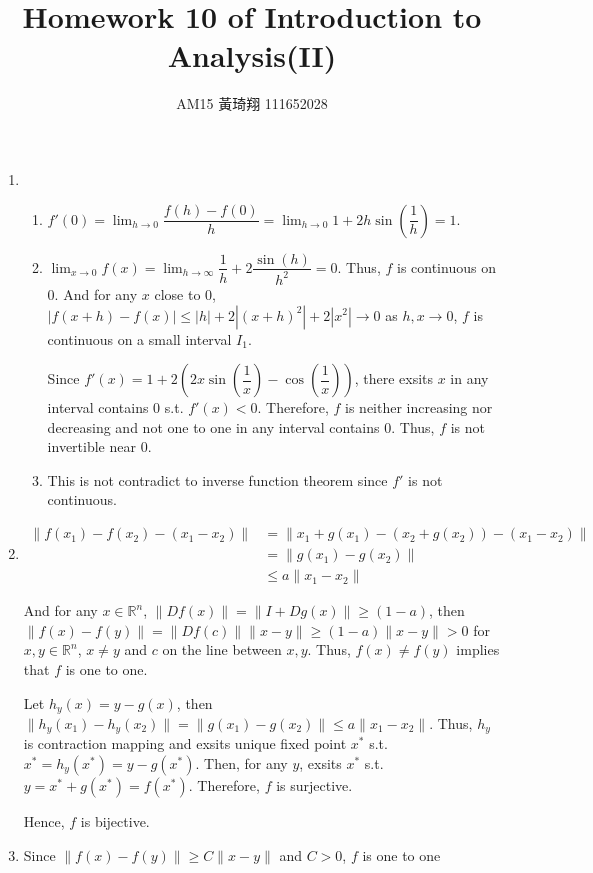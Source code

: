 \documentclass[12pt]{article}
\title{Homework 10 of Introduction to Analysis(II)}
\author{AM15 黃琦翔 111652028}
\begin{document}
\maketitle
\begin{enumerate}
    \item \begin{enumerate}
        \item $f'(0) = \displaystyle\lim_{h\to 0} \dfrac{f(h) - f(0)}{h} = \displaystyle\lim_{h\to 0} 1 + 2h\sin(\dfrac{1}{h}) = 1$.
        
        \item $\displaystyle\lim_{x\to 0} f(x) = \displaystyle\lim_{h\to \infty} \dfrac{1}{h} + 2\dfrac{\sin(h)}{h^2} = 0$.
        Thus, $f$ is continuous on $0$.
        And for any $x$ close to $0$, $|f(x+h) - f(x)| \leq |h| + 2|(x+h)^2| + 2|x^2| \to 0$ as $h, x \to 0$, $f$ is continuous on a small interval $I_1$.

        Since $f'(x) = 1 + 2(2x\sin(\dfrac{1}{x}) - \cos(\dfrac{1}{x}))$, there exsits $x$ in any interval contains $0$ s.t. $f'(x)< 0$.
        Therefore, $f$ is neither increasing nor decreasing and not one to one in any interval contains $0$.
        Thus, $f$ is not invertible near $0$.

        \item This is not contradict to inverse function theorem since $f'$ is not continuous.
    \end{enumerate}

    \item \begin{align*}
        \| f(x_1) - f(x_2) - (x_1 - x_2)\| &= \| x_1 + g(x_1) - (x_2 + g(x_2)) - (x_1 - x_2) \| \\
        &= \| g(x_1) - g(x_2)\|\\
        &\leq a\| x_1 - x_2\|
    \end{align*}

    And for any $x\in \mathbb{R}^n$, $\|Df(x)\| = \|I + Dg(x)\| \geq (1-a)$,
    then $\| f(x) - f(y)\| = \|Df(c)\| \|x-y\| \geq (1-a)\|x-y\| > 0$ for $x, y\in \mathbb{R}^n$, $x\neq y$ and $c$ on the line between $x, y$.
    Thus, $f(x) \neq f(y)$ implies that $f$ is one to one.

    Let $h_y(x) = y - g(x)$, then $\| h_y(x_1) - h_y(x_2)\| = \| g(x_1) - g(x_2) \| \leq a\|x_1 - x_2\|$.
    Thus, $h_y$ is contraction mapping and exsits unique fixed point $x^*$ s.t. $x^* = h_y(x^*) = y - g(x^*)$.
    Then, for any $y$, exsits $x^*$ s.t. $y = x^* + g(x^*) = f(x^*)$.
    Therefore, $f$ is surjective.
    
    Hence, $f$ is bijective.
   
    \item Since $\|f(x) - f(y) \| \geq C\| x-y \|$ and $C > 0$, $f$ is one to one
    
\end{enumerate}
\end{document}
